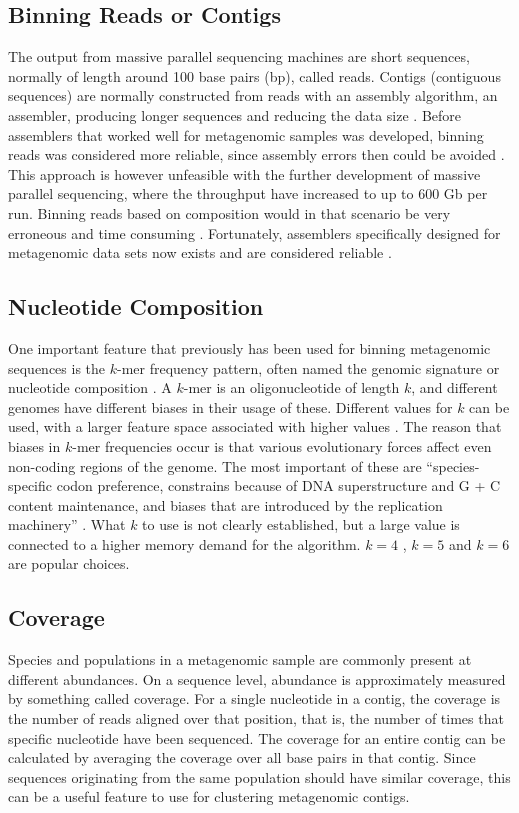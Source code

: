 \subsection{Binning Reads or Contigs}
The output from massive parallel sequencing machines are short sequences, normally of length around 100 base pairs (bp), called reads. Contigs (contiguous sequences) are normally constructed from reads with an assembly algorithm, an assembler, producing longer sequences and reducing the data size \parencite{Droge2012}.  Before assemblers that worked well for metagenomic samples was developed, binning reads was considered more reliable, since assembly errors then could be avoided \parencite{Chatterji2008}. This approach is however unfeasible with the further development of massive parallel sequencing, where the throughput have increased to up to 600 Gb per run. Binning reads based on composition would in that scenario be very erroneous and time consuming \parencite{Droge2012}. Fortunately, assemblers specifically designed for metagenomic data sets now exists and are considered reliable \parencite{Strous2012a}. 

\subsection{Nucleotide Composition}
One important feature that previously has been used for binning metagenomic sequences is the $k$-mer frequency pattern, often named the genomic signature or nucleotide composition
\parencite{Mchardy2007, Chatterji2008}. A $k$-mer is an oligonucleotide of length $k$, and different genomes have different biases in their usage of these. Different values for $k$ can be used, with a larger feature space associated with higher values \parencite{Chatterji2008}. The reason that biases in $k$-mer frequencies occur is that various evolutionary forces affect even non-coding regions of the genome. The most important of these are ``species-specific codon preference, constrains because of DNA superstructure and G + C content maintenance, and biases that are introduced
by the replication machinery'' \parencite{Kelley2010}. What $k$ to use is not clearly established, but a large value is connected to a higher memory demand for the algorithm. $k=4$ \parencite{Teeling2004}, $k=5$ \parencite{Mchardy2007} and $k=6$ \parencite{Chatterji2008} are popular choices.

\subsection{Coverage}
Species and populations in a metagenomic sample are commonly present at different abundances. On a sequence level, abundance is approximately measured by something called coverage. For a single nucleotide in a contig, the coverage is the number of reads aligned over that position, that is, the number of times that specific nucleotide have been sequenced. The coverage for an entire contig can be calculated by averaging the coverage over all base pairs in that contig. Since sequences originating from the same population should have similar coverage, this can be a useful feature to use for clustering metagenomic contigs. 



